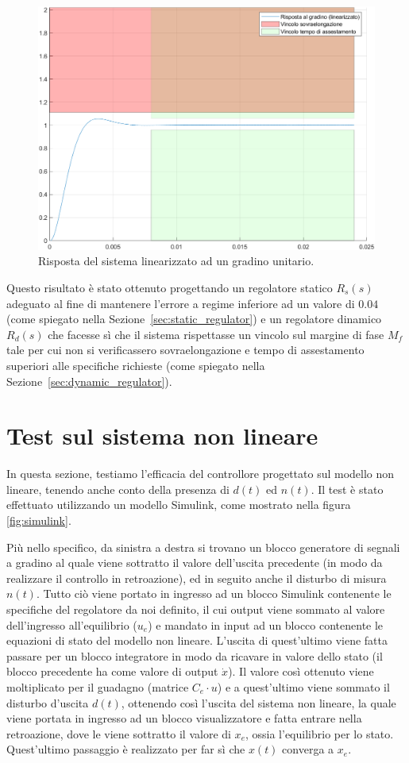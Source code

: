 \documentclass[a4paper, 11pt]{article}
\begin{document}
\begin{figure}[h!]
	\centering
	\includegraphics[width=0.75\linewidth]{./images/stepRespLin.png}
	\caption{Risposta del sistema linearizzato ad un gradino unitario.}
	\label{fig:step_response}
\end{figure}

Questo risultato \`e stato ottenuto progettando un regolatore statico $R_s(s)$ adeguato al fine di mantenere l'errore a regime inferiore ad un valore di $0.04$ (come spiegato nella Sezione~\ref{sec:static_regulator}) 
e un regolatore dinamico $R_d(s)$ che facesse s\`i che il sistema rispettasse un vincolo sul margine di fase $M_f$ tale per cui non si verificassero sovraelongazione e tempo di assestamento superiori alle specifiche richieste
(come spiegato nella Sezione~\ref{sec:dynamic_regulator}).

\section{Test sul sistema non lineare}

In questa sezione, testiamo l'efficacia del controllore progettato sul modello non lineare, tenendo anche conto della presenza di $d(t)$ ed $n(t)$. 
Il test \`e stato effettuato utilizzando un modello Simulink, come mostrato nella figura \ref{fig:simulink}.

Pi\`u nello specifico,
da sinistra a destra si trovano un blocco generatore di segnali a gradino al quale viene sottratto il valore dell'uscita precedente (in modo da realizzare il controllo in retroazione), ed in seguito anche il disturbo di misura $n(t)$. 
Tutto ci\`o viene portato in ingresso ad un blocco Simulink contenente le specifiche del regolatore da noi definito, il cui output viene sommato al valore dell'ingresso all'equilibrio ($u_e$) e mandato in input ad un blocco contenente
le equazioni di stato del modello non lineare. L'uscita di quest'ultimo viene fatta passare per un blocco integratore in modo da ricavare in valore dello stato (il blocco precedente ha come valore di output $\dot{x}$). Il valore cos\`i ottenuto 
viene moltiplicato per il guadagno (matrice $C_e\cdot u$) e a quest'ultimo viene sommato il disturbo d'uscita $d(t)$, ottenendo cos\`i l'uscita del sistema non lineare, la quale viene portata in ingresso ad un blocco visualizzatore e fatta entrare nella retroazione,
dove le viene sottratto il valore di $x_e$, ossia l'equilibrio per lo stato. Quest'ultimo passaggio è realizzato per far sì che $x(t)$ converga a $x_e$.
\end{document}
